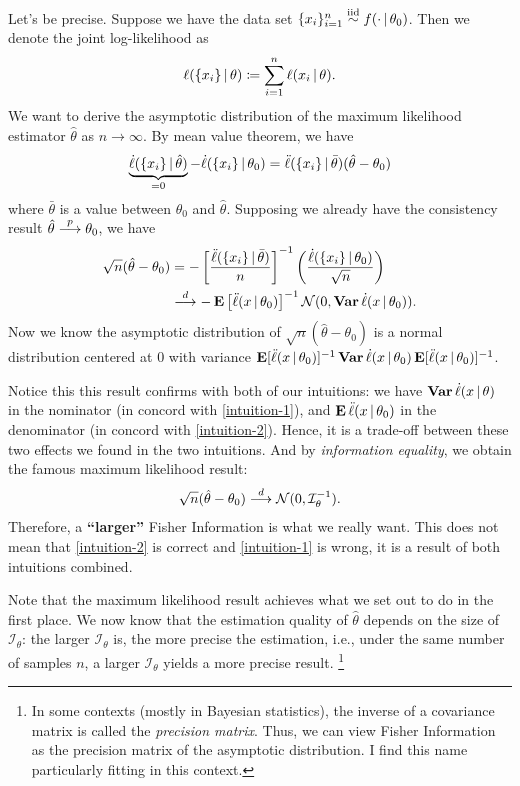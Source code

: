 \documentclass[a4paper]{article}
\begin{document}
Let's be precise.
Suppose we have the data set $\{x_{i}\}_{i=1}^{n}\overset{\text{\scriptsize iid}}{\sim} f(\cdot\,|\,\theta_0)$.
Then we denote the joint log-likelihood as
\begin{align*}
	\ell(\{x_i\}\,|\,\theta) \coloneqq \sum_{i=1}^{n} \ell(x_i\,|\,\theta).
\end{align*}
We want to derive the asymptotic distribution of the maximum likelihood estimator $\hat\theta$ as $n\to\infty$.
By mean value theorem, we have
\begin{align*}
	\underbrace{\dot\ell(\{x_i\}\,|\,\hat\theta)}_{=0} - \dot\ell(\{x_i\}\,|\,\theta_{0}) = \ddot\ell(\{x_i\}\,|\,\bar\theta) (\hat\theta - \theta_0)
\end{align*}
where $\bar\theta$ is a value between $\theta_0$ and $\hat\theta$.
Supposing we already have the consistency result $\hat\theta\overset{p}{\longrightarrow}\theta_0$,
we have
\begin{align*}
	\sqrt{n} ( \hat\theta - \theta_0 )
	&= - \left[ \frac{ \ddot\ell(\{x_i\}\,|\,\bar\theta) }{ n } \right]^{-1} \left( \frac{ \dot\ell(\{x_i\}\,|\,\theta_{0}) }{ \sqrt{n} } \right) \\
	&\overset{d}{\longrightarrow} - \operatorname{\text{\textrm{\upshape\textbf{E}}}}\left[\ddot\ell(x\,|\,\theta_0)\right]^{-1} \mathcal{N}(0,\operatorname{\text{\textrm{\upshape\textbf{Var}}}}\dot\ell(x\,|\,\theta_0)).
\end{align*}
Now we know the asymptotic distribution of $\sqrt{n}(\hat\theta-\theta_0)$ is a normal distribution centered at $0$ with variance
$\operatorname{\text{\textrm{\upshape\textbf{E}}}}[\ddot\ell(x\,|\,\theta_0)]^{-1}\operatorname{\text{\textrm{\upshape\textbf{Var}}}}\dot\ell(x\,|\,\theta_0)\operatorname{\text{\textrm{\upshape\textbf{E}}}}[\ddot\ell(x\,|\,\theta_0)]^{-1}$.

Notice this this result confirms with both of our intuitions:
we have $\operatorname{\text{\textrm{\upshape\textbf{Var}}}}\dot\ell(x\,|\,\theta)$ in the nominator (in concord with \autoref{intuition-1}),
and $\operatorname{\text{\textrm{\upshape\textbf{E}}}}\ddot\ell(x\,|\,\theta_0)$ in the denominator (in concord with \autoref{intuition-2}).
Hence, it is a trade-off between these two effects we found in the two intuitions.
And by \emph{information equality}, we obtain the famous maximum likelihood result:
\begin{align*}
	\sqrt{n} ( \hat\theta - \theta_0 ) \overset{d}{\longrightarrow} \mathcal{N}(0,\mathcal{I}_{\theta}^{-1}).
\end{align*}
Therefore, a \textbf{``larger''} Fisher Information is what we really want.
This does not mean that \autoref{intuition-2} is correct and \autoref{intuition-1} is wrong,
it is a result of both intuitions combined.

Note that the maximum likelihood result achieves what we set out to do in the first place.
We now know that the estimation quality of $\hat\theta$ depends on the size of $\mathcal{I}_{\theta}$:
the larger $\mathcal{I}_{\theta}$ is, the more precise the estimation,
i.e., under the same number of samples $n$, a larger $\mathcal{I}_{\theta}$ yields a more precise result.
\footnote{
	In some contexts (mostly in Bayesian statistics),
	the inverse of a covariance matrix is called the \emph{precision matrix}.
	Thus, we can view Fisher Information as the precision matrix of the asymptotic distribution.
	I find this name particularly fitting in this context.
}
\end{document}

